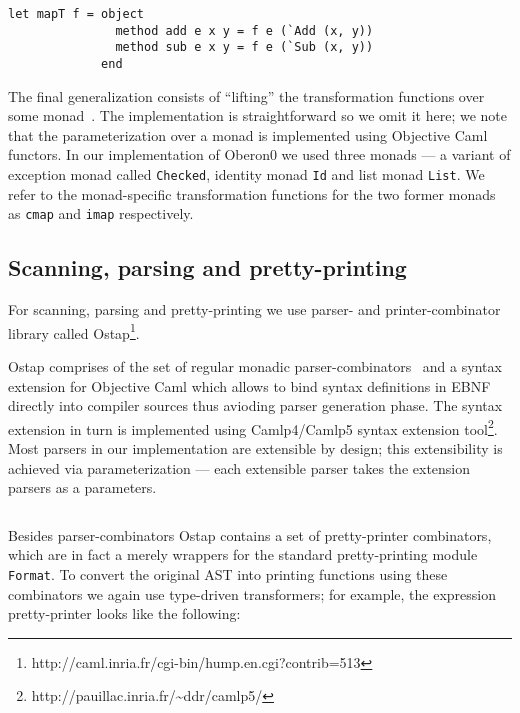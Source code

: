 \begin{lstlisting}
let mapT f = object
               method add e x y = f e (`Add (x, y))
               method sub e x y = f e (`Sub (x, y))
             end
\end{lstlisting}

The final generalization consists of ``lifting'' the transformation functions
over some monad~\cite{Monads}. The implementation is straightforward so we omit it
here; we note that the parameterization over a monad is implemented using Objective 
Caml functors. In our implementation of Oberon0 we used three monads --- a variant 
of exception monad called \lstinline{Checked}, identity monad \lstinline{Id} and list 
monad \lstinline{List}. We refer to the monad-specific transformation functions for 
the two former monads as \lstinline{cmap} and \lstinline{imap} respectively.

\subsection{Scanning, parsing and pretty-printing}

For scanning, parsing and pretty-printing we use parser- and printer-combinator
library called Ostap\footnote{http://caml.inria.fr/cgi-bin/hump.en.cgi?contrib=513}. 

Ostap comprises of the set of regular monadic parser-combinators~\cite{MonadicParserCombinators} 
and a syntax extension for Objective Caml which allows to bind syntax definitions in
EBNF directly into compiler sources thus avioding parser generation phase. The syntax
extension in turn is implemented using Camlp4/Camlp5 syntax extension 
tool\footnote{http://pauillac.inria.fr/\textasciitilde ddr/camlp5/}. Most parsers
in our implementation are extensible by design; this extensibility is achieved
via parameterization --- each extensible parser takes the extension parsers as
a parameters. 

\begin{lstlisting}

\end{lstlisting}

Besides parser-combinators Ostap contains a set of pretty-printer combinators, which are
in fact a merely wrappers for the standard pretty-printing module \lstinline{Format}. To
convert the original AST into printing functions using these combinators we again
use type-driven transformers; for example, the expression pretty-printer looks like
the following:

